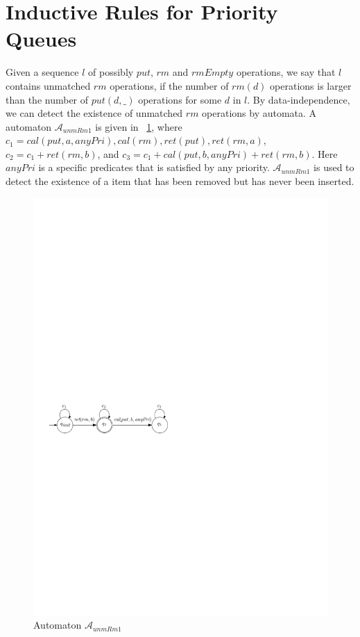\PQueueisStepByStepLinearizability*


\section{Inductive Rules for Priority Queues}
\label{sec:inductive rules for priority queues}



Given a sequence $l$ of possibly $\textit{put}$, $\textit{rm}$ and $\textit{rmEmpty}$ operations, we say that $l$ contains unmatched $\textit{rm}$ operations, if the number of $\textit{rm}(d)$ operations is larger than the number of $\textit{put}(d,\_)$ operations for some $d$ in $l$. By data-independence, we can detect the existence of unmatched $\textit{rm}$ operations by automata. A automaton $\mathcal{A}_{\textit{unmRm1}}$ is given in \figurename~\ref{fig:automata for unmatched rm1}, where $c_1=\textit{cal}(\textit{put},a,\textit{anyPri}),\textit{cal}(rm),\textit{ret}(\textit{put}),\textit{ret}(\textit{rm},a)$, $c_2=c_1 + \textit{ret}(\textit{rm},b)$, and $c_3 = c_1 + \textit{cal}(\textit{put},b,\textit{anyPri}) + \textit{ret}(\textit{rm},b)$. Here $\textit{anyPri}$ is a specific predicates that is satisfied by any priority. $\mathcal{A}_{\textit{unmRm1}}$ is used to detect the existence of a item that has been removed but has never been inserted.

\begin{figure}[htbp]
  \centering
  \includegraphics[width=0.5 \textwidth]{PIC_AUTO_UNMATCHED_RM1.pdf}
  \caption{Automaton $\mathcal{A}_{\textit{unmRm1}}$}
  \label{fig:automata for unmatched rm1}
\end{figure}

